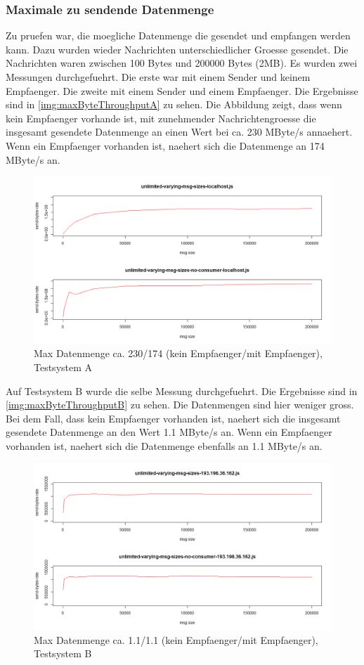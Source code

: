 \subsubsection{Maximale zu sendende Datenmenge}
Zu pruefen war, die moegliche Datenmenge die gesendet und empfangen werden kann. Dazu wurden wieder Nachrichten unterschiedlicher Groesse gesendet. Die Nachrichten waren zwischen 100 Bytes und 200000 Bytes (2MB). Es wurden zwei Messungen durchgefuehrt. Die erste war mit einem Sender und keinem Empfaenger. Die zweite mit einem Sender und einem Empfaenger. 
Die Ergebnisse sind in \autoref{img:maxByteThroughputA} zu sehen. Die Abbildung zeigt, dass wenn kein Empfaenger vorhande ist, mit zunehmender Nachrichtengroesse die insgesamt gesendete Datenmenge an einen Wert bei ca. 230 MByte/s annaehert. Wenn ein Empfaenger vorhanden ist, naehert sich die Datenmenge an 174 MByte/s an.
\begin{figure}
\center
  \includegraphics[width=1\textwidth]{images/max-byte-throughput-A.png}
  \caption{Max Datenmenge ca. 230/174 (kein Empfaenger/mit Empfaenger), Testsystem A}
  \label{img:maxByteThroughputA}
\end{figure}
Auf Testsystem B wurde die selbe Messung durchgefuehrt. 
Die Ergebnisse sind in \autoref{img:maxByteThroughputB} zu sehen. Die Datenmengen sind hier weniger gross. Bei dem Fall, dass kein Empfaenger vorhanden ist, naehert sich die  insgesamt gesendete Datenmenge an den Wert 1.1 MByte/s an. Wenn ein Empfaenger vorhanden ist, naehert sich die Datenmenge ebenfalls an 1.1 MByte/s an.
\begin{figure}
\center
  \includegraphics[width=1\textwidth]{images/max-byte-throughput-B.png}
  \caption{Max Datenmenge ca. 1.1/1.1 (kein Empfaenger/mit Empfaenger), Testsystem B}
  \label{img:maxByteThroughputB}
\end{figure}
